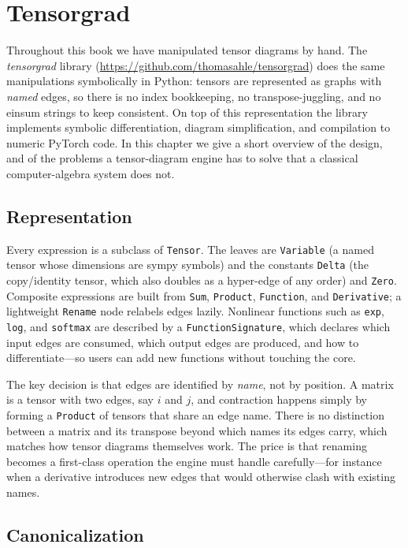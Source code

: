 
\chapter{Tensorgrad}

Throughout this book we have manipulated tensor diagrams by hand.
The \emph{tensorgrad} library (\url{https://github.com/thomasahle/tensorgrad})
does the same manipulations symbolically in Python: tensors are represented as
graphs with \emph{named} edges, so there is no index bookkeeping, no
transpose-juggling, and no einsum strings to keep consistent.
On top of this representation the library implements symbolic differentiation,
diagram simplification, and compilation to numeric PyTorch code.
In this chapter we give a short overview of the design, and of the problems a
tensor-diagram engine has to solve that a classical computer-algebra system does not.

\section{Representation}

Every expression is a subclass of \texttt{Tensor}.
The leaves are \texttt{Variable} (a named tensor whose dimensions are sympy
symbols) and the constants \texttt{Delta} (the copy/identity tensor, which also
doubles as a hyper-edge of any order) and \texttt{Zero}.
Composite expressions are built from \texttt{Sum}, \texttt{Product},
\texttt{Function}, and \texttt{Derivative}; a lightweight \texttt{Rename}
node relabels edges lazily.
Nonlinear functions such as \texttt{exp}, \texttt{log}, and \texttt{softmax}
are described by a \texttt{FunctionSignature}, which declares which input edges
are consumed, which output edges are produced, and how to differentiate---so
users can add new functions without touching the core.

The key decision is that edges are identified by \emph{name}, not by position.
A matrix is a tensor with two edges, say $i$ and $j$, and contraction happens
simply by forming a \texttt{Product} of tensors that share an edge name.
There is no distinction between a matrix and its transpose beyond which names
its edges carry, which matches how tensor diagrams themselves work.
The price is that renaming becomes a first-class operation the engine must
handle carefully---for instance when a derivative introduces new edges that
would otherwise clash with existing names.

\section{Canonicalization}

